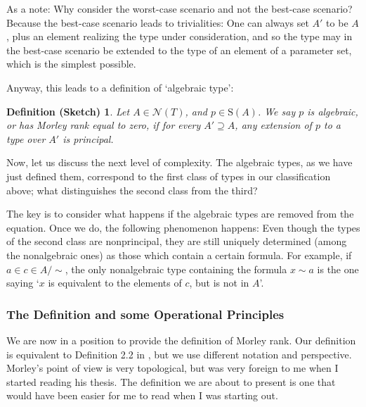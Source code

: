 \documentclass{article}
\newtheorem{defsketch}[theorem]{Definition (Sketch)}
\theoremstyle{nonumberplain}
\newcommand{\calN}{\mathcal{N}}
\newcommand{\Stone}{\mathrm{S}}
\begin{document}
As a note: Why consider the worst-case scenario and not the best-case scenario? Because the best-case scenario leads to trivialities: One can always set $A'$ to be $A$, plus an element realizing the type under consideration, and so the type may in the best-case scenario be extended to the type of an element of a parameter set, which is the simplest possible.

Anyway, this leads to a definition of `algebraic type':

\begin{defsketch}
Let $A \in \calN(T)$, and $p \in \Stone(A)$. We say $p$ is \emph{algebraic}, or has Morley rank equal to zero, if for every $A' \supseteq A$, any extension of $p$ to a type over $A'$ is principal.
\end{defsketch}

Now, let us discuss the next level of complexity. The algebraic types, as we have just defined them, correspond to the first class of types in our classification above; what distinguishes the second class from the third?

The key is to consider what happens if the algebraic types are removed from the equation. Once we do, the following phenomenon happens: Even though the types of the second class are nonprincipal, they are still uniquely determined (among the nonalgebraic ones) as those which contain a certain formula. For example, if $a \in c \in A/{\sim}$, the only nonalgebraic type containing the formula $x \sim a$ is the one saying `$x$ is equivalent to the elements of $c$, but is not in $A$'.

\subsubsection{The Definition and some Operational Principles}

We are now in a position to provide the definition of Morley rank. Our definition is equivalent to Definition 2.2 in \cite{morley}, but we use different notation and perspective. Morley's point of view is very topological, but was very foreign to me when I started reading his thesis. The definition we are about to present is one that would have been easier for me to read when I was starting out.
\end{document}
